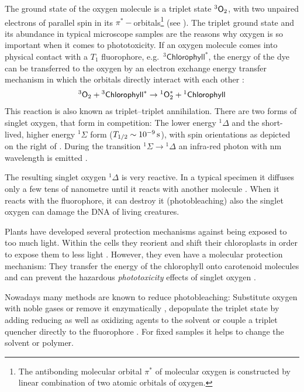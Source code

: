 The ground state of the oxygen molecule is a triplet state ${}^3\textsf{O}_2$,   
with two unpaired electrons of parallel spin in its
$\pi^*-$orbitals\footnote{The antibonding molecular orbital $\pi^*$ of
  molecular oxygen is constructed by linear combination of two atomic
  orbitals of oxygen.}  (see ). The triplet ground
state and its abundance in typical microscope samples are the reasons
why oxygen is so important when it comes to phototoxicity. If an
oxygen molecule comes into physical contact with a $T_1$ fluorophore,
e.g.\ ${}^3\textsf{Chlorophyll}^*$, the energy of the dye can be
transferred to the oxygen by an electron exchange energy transfer
mechanism in which the orbitals directly interact with each other
\citetext{\citealp[p.~438]{Haken2006} and \citealp{Linde2011a}}:
\begin{align}
  {}^3\textsf{O}_2 + {}^3\textsf{Chlorophyll}^* \rightarrow
  {}^1\textsf{O}^*_2+{}^1\textsf{Chlorophyll}
\end{align}
This reaction is also known as triplet--triplet annihilation.  There
are two forms of singlet oxygen, that form in competition: The lower
energy ${}^1\Delta$ and the short-lived, higher energy ${}^1\Sigma$
form ($T_{1/2}\sim\unit[10^{-9}]{s}$), with spin orientations as
depicted on the right of . During the transition
${}^1\Sigma\rightarrow{}^1\Delta$ an infra-red photon with
\unit[1268]{nm} wavelength is emitted \citep[p.~20]{Linde2011a}.

The resulting singlet oxygen ${}^1\Delta$ is very reactive. In a       
typical specimen it diffuses only a few tens of nanometre until it
reacts with another molecule \citep{Sauer2011}. When it reacts with
the fluorophore, it can destroy it (photobleaching) also the singlet
oxygen can damage the DNA of living creatures. 

Plants have developed several protection mechanisms against being      
exposed to too much light. Within the cells they reorient and shift
their chloroplasts in order to expose them to less light
\citep{Reshak2009}.  However, they even have a molecular protection
mechanism: They transfer the energy of the chlorophyll onto carotenoid
molecules and can prevent the hazardous \emph{phototoxicity} effects
of singlet oxygen \citep{Krieger-Liszkay2005}.

Nowadays many methods are known to reduce photobleaching: Substitute  
oxygen with noble gases or remove it enzymatically
\citep[p.~89]{Sauer2011}, depopulate the triplet state by adding
reducing as well as oxidizing agents to the solvent
\citep{Vogelsang2008} or couple a triplet quencher directly to the
fluorophore \citep[p.~19]{Sauer2011}. For fixed samples it helps to
change the solvent or polymer.
 
